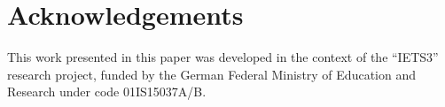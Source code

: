 \documentclass{llncs}
\begin{document}
 



 



%



 

\section*{Acknowledgements}
 \vspace{-.3cm}
This work presented in this paper was developed in the context of the
``IETS3'' research project, funded by the German Federal Ministry of Education
and Research under code 01IS15037A/B.
 \vspace{-.3cm}



\end{document}
